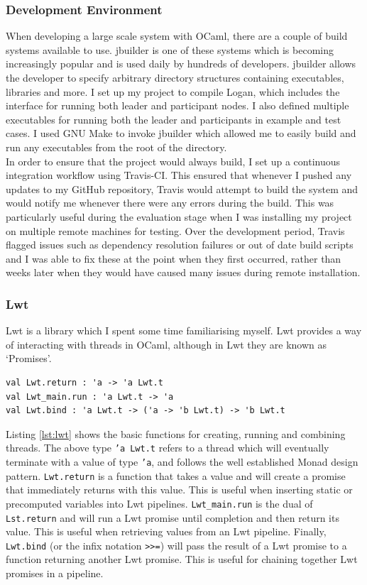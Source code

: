 \documentclass[12pt,a4paper,twoside,openright]{report}
\begin{document}
	\subsubsection*{Development Environment}
	When developing a large scale system with OCaml, there are a couple of build systems available to use. 
	jbuilder \parencite{jbuilder} is one of these systems which is becoming increasingly popular and is used daily by hundreds of developers.
	jbuilder allows the developer to specify arbitrary directory structures containing executables, libraries and more.
	I set up my project to compile Logan, which includes the interface for running both leader and participant nodes. 
	I also defined multiple executables for running both the leader and participants in example and test cases. 
	I used GNU Make \parencite{GNUMake} to invoke jbuilder which allowed me to easily build and run any executables from the root of the directory.\\
	
	In order to ensure that the project would always build, I set up a continuous integration workflow using Travis-CI. 
	This ensured that whenever I pushed any updates to my GitHub repository, Travis would attempt to build the system and would notify me whenever there were any errors during the build.
	This was particularly useful during the evaluation stage when I was installing my project on multiple remote machines for testing.
	Over the development period, Travis flagged issues such as dependency resolution failures or out of date build scripts and I was able to fix these at the point when they first occurred, rather than weeks later when they would have caused many issues during remote installation.

	\subsubsection*{Lwt}
	Lwt \parencite{Lwt} is a library which I spent some time familiarising myself. 
	Lwt provides a way of interacting with threads in OCaml, although in Lwt they are known as `Promises'.
	\begin{lstlisting}[caption={Lwt Promises},label={lst:lwt}]
val Lwt.return : 'a -> 'a Lwt.t 
val Lwt_main.run : 'a Lwt.t -> 'a
val Lwt.bind : 'a Lwt.t -> ('a -> 'b Lwt.t) -> 'b Lwt.t
	\end{lstlisting}
	Listing \ref{lst:lwt} shows the basic functions for creating, running and combining threads.
	The above type \texttt{'a Lwt.t} refers to a thread which will eventually terminate with a value of type \texttt{'a}, and follows the well established Monad design pattern.
	\texttt{Lwt.return} is a function that takes a value and will create a promise that immediately returns with this value.
	This is useful when inserting static or precomputed variables into Lwt pipelines.
	\texttt{Lwt\_main.run} is the dual of \texttt{Lst.return} and will run a Lwt promise until completion and then return its value.
	This is useful when retrieving values from an Lwt pipeline.
	Finally, \texttt{Lwt.bind} (or the infix notation \texttt{>>=}) will pass the result of a Lwt promise to a function returning another Lwt promise.
	This is useful for chaining together Lwt promises in a pipeline.
\end{document}
